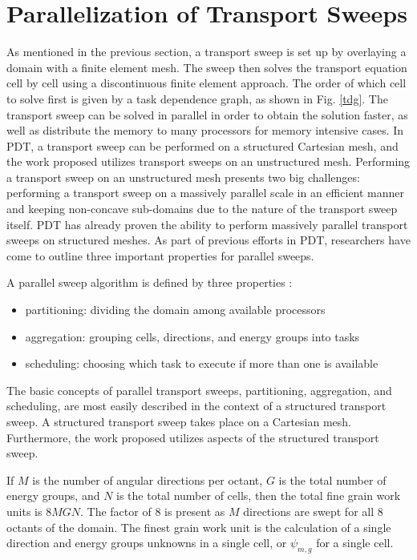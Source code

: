 \documentclass[11pt, letterpaper,titlepage,oneside]{article}
\begin{document}
\section{Parallelization of Transport Sweeps}

As mentioned in the previous section, a transport sweep is set up by overlaying a domain with a finite element mesh. The sweep then solves the transport equation cell by cell using a discontinuous finite element approach. The order of which cell to solve first is given by a task dependence graph, as shown in Fig. \ref{tdg}. The transport sweep can be solved in parallel in order to obtain the solution faster, as well as distribute the memory to many processors for memory intensive cases. In PDT, a transport sweep can be performed on a structured Cartesian mesh, and the work proposed utilizes transport sweeps on an unstructured mesh. Performing a transport sweep on an unstructured mesh presents two big challenges: performing a transport sweep on a massively parallel scale in an efficient manner and keeping non-concave sub-domains due to the nature of the transport sweep itself. PDT has already proven the ability to perform massively parallel transport sweeps on structured meshes. As part of previous efforts in PDT, researchers have come to outline three important properties for parallel sweeps. 

A parallel sweep algorithm is defined by three properties\cite{mpadams2013} :
\begin{itemize}
\item partitioning: dividing the domain among available processors
\item aggregation: grouping cells, directions, and energy groups into tasks
\item scheduling: choosing which task to execute if more than one is available
\end{itemize}

The basic concepts of parallel transport sweeps, partitioning, aggregation, and scheduling, are most easily described in the context of a structured transport sweep. A structured transport sweep takes place on a Cartesian mesh. Furthermore, the work proposed utilizes aspects of the structured transport sweep.

If $M$ is the number of angular directions per octant, $G$ is the total number of energy groups, and $N$ is the total number of cells, then the total fine grain work units is $8MGN$. The factor of 8 is present as $M$ directions are swept for all 8 octants of the domain. The finest grain work unit is the calculation of a single direction and energy groups unknowns in a single cell, or $\psi_{m,g}$ for a single cell.
\end{document}
